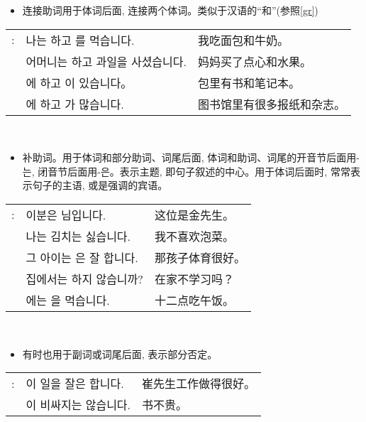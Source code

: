 \begin{grammar}
    \begin{grammarsect}[\kr -하고]
    \begin{itemize}
        \item 连接助词用于体词后面, 连接两个体词。类似于汉语的“和”(参照\ref{gr})
    \end{itemize}
    \begin{tabular}{lll}
        \kr \ruby{例}{예}: &\kr 나는 \ruby{빵}{pão}하고 \ruby{牛乳}{우유}를 먹습니다.&我吃面包和牛奶。 \\
        &\kr 어머니는 \ruby{菓子}{과자}하고 과일을 사셨습니다. &妈妈买了点心和水果。\\ 
        &\kr \ruby{가방}{かばん}에 \ruby{冊}{책}하고 \ruby{空冊}{공책}이 있습니다。&包里有书和笔记本。\\
        &\kr \ruby{圖書館}{도서관}에 \ruby{新聞}{신문}하고 \ruby{雜誌}{잡지}가 많습니다.&图书馆里有很多报纸和杂志。\\
    \end{tabular}\\
    \end{grammarsect}
    \begin{grammarsect}[\kr -은/-는]
        \begin{itemize}
            \item 补助词。用于体词和部分助词、词尾后面, 体词和助词、词尾的开音节后面用{\kr -는}, 闭音节后面用{\kr -은}。表示主题, 即句子叙述的中心。用于体词后面时, 常常表示句子的主语, 或是强调的宾语。
        \end{itemize}
        \begin{tabular}{lll}
            \kr \ruby{例}{예}: &\kr 이분은 \ruby{金}{김} \ruby{先生}{선생}님입니다.&这位是金先生。\\
            &\kr 나는 김치는 싫습니다.&我不喜欢泡菜。\\
            &\kr 그 아이는 \ruby{運動}{운동}은 잘 합니다.&那孩子体育很好。\\
            &\kr 집에서는 \ruby{工夫}{공부}하지 않습니까?&在家不学习吗？\\
            &\kr \ruby{/2}{열두}\ruby{時}{시}에는 \ruby{點心}{점심}을 먹습니다.&十二点吃午饭。
        \end{tabular}\\
        \begin{itemize}
            \item 有时也用于副词或词尾后面, 表示部分否定。
        \end{itemize}
        \begin{tabular}{lll}
            \kr \ruby{例}{예}: &\kr \ruby{崔}{최} \ruby{先生}{선생}이 일을 잘은 합니다.&崔先生工作做得很好。\\
            &\kr \ruby{冊}{책}이 비싸지는 않습니다.&书不贵。
        \end{tabular}\\
    \end{grammarsect}
\end{grammar}
